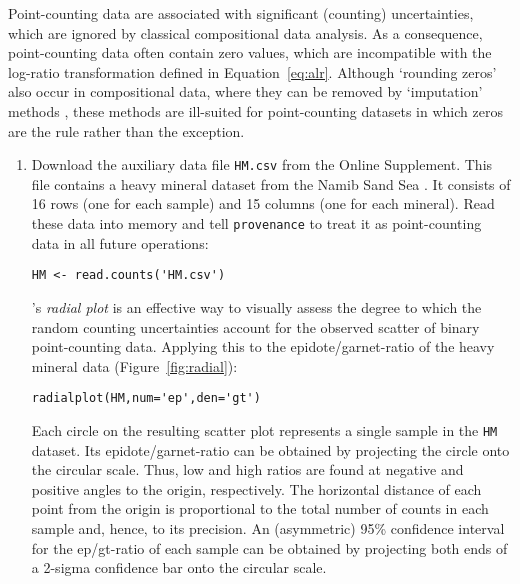 \documentclass[11pt]{article}
\begin{document}
Point-counting data are associated with significant (counting)
uncertainties, which are ignored by classical compositional data
analysis. As a consequence, point-counting data often contain zero
values, which are incompatible with the log-ratio transformation
defined in Equation~\ref{eq:alr}. Although `rounding zeros' also occur
in compositional data, where they can be removed by `imputation'
methods \citep{martin2003, bloemsma2015}, these methods are ill-suited
for point-counting datasets in which zeros are the rule rather than
the exception.

\begin{enumerate}
  
\item Download the auxiliary data file \texttt{HM.csv} from the Online
  Supplement. This file contains a heavy mineral dataset from the
  Namib Sand Sea \citep{vermeesch2015}. It consists of 16 rows (one
  for each sample) and 15 columns (one for each mineral).  Read these
  data into memory and tell \texttt{provenance} to treat it as
  point-counting data in all future operations:

\begin{verbatim}
HM <- read.counts('HM.csv')
\end{verbatim}

\citet{galbraith1988}'s \emph{radial plot} is an effective way to
visually assess the degree to which the random counting uncertainties
account for the observed scatter of binary point-counting
data. Applying this to the epidote/garnet-ratio of the heavy mineral
data (Figure~\ref{fig:radial}):

\begin{verbatim}
radialplot(HM,num='ep',den='gt')
\end{verbatim}

Each circle on the resulting scatter plot represents a single sample
in the \texttt{HM} dataset. Its epidote/garnet-ratio can be obtained
by projecting the circle onto the circular scale. Thus, low and high
ratios are found at negative and positive angles to the origin,
respectively. The horizontal distance of each point from the origin is
proportional to the total number of counts in each sample and, hence,
to its precision. An (asymmetric) 95\% confidence interval for the
ep/gt-ratio of each sample can be obtained by projecting both ends of
a 2-sigma confidence bar onto the circular scale.
\end{enumerate}
\end{document}
